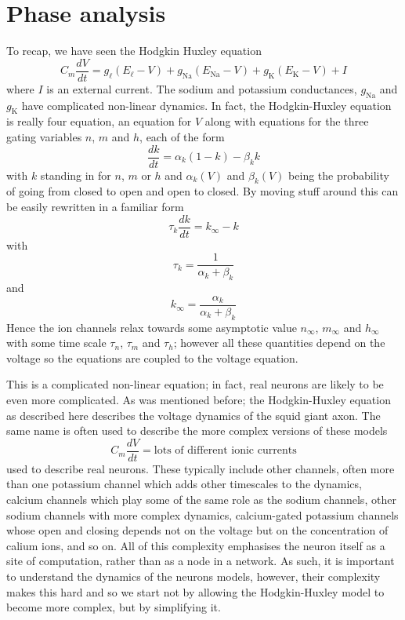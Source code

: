\documentclass[12pt]{article}
\begin{document}
\section*{Phase analysis}
To recap, we have seen the Hodgkin Huxley equation
\begin{equation}
C_m\frac{dV}{dt}=g_\ell(E_{\ell}-V)+g_{\text{Na}}(E_{\text{Na}}-V)+g_{\text{K}}(E_{\text{K}}-V)+I
\end{equation}
where $I$ is an external current. The sodium and potassium conductances, $g_{\text{Na}}$ and
$g_{\text{K}}$ have complicated non-linear dynamics. In fact, the
Hodgkin-Huxley equation is really four equation, an equation for $V$
along with equations for the three gating variables $n$, $m$ and $h$, each of the form
\begin{equation}
\frac{dk}{dt}=\alpha_k(1-k)-\beta_k k
\end{equation}
with $k$ standing in for $n$, $m$ or $h$ and $\alpha_k(V)$ and $\beta_k(V)$
being the probability of going from closed to open and open to
closed. By moving stuff around this can be easily rewritten in a familiar form
\begin{equation}
\tau_k\frac{dk}{dt}=k_\infty - k
\end{equation}
with 
\begin{equation}
\tau_k=\frac{1}{\alpha_k+\beta_k}
\end{equation}
and
\begin{equation}
k_\infty=\frac{\alpha_k}{\alpha_k+\beta_k}
\end{equation}
Hence the ion channels relax towards some asymptotic value $n_\infty$,
$m_\infty$ and $h_\infty$ with some time scale $\tau_n$, $\tau_m$ and
$\tau_h$; however all these quantities depend on the voltage so the
equations are coupled to the voltage equation.

This is a complicated non-linear equation; in fact, real neurons are
likely to be even more complicated. As was mentioned before; the
Hodgkin-Huxley equation as described here describes the voltage
dynamics of the squid giant axon. The same name is often used to
describe the more complex versions of these models
\begin{equation}
C_m\frac{dV}{dt}=\mbox{lots of different ionic currents}
\end{equation}
used to describe real neurons. These typically include other channels,
often more than one potassium channel which adds other timescales to
the dynamics, calcium channels which play some of the same role as the
sodium channels, other sodium channels with more complex dynamics,
calcium-gated potassium channels whose open and closing depends not on
the voltage but on the concentration of calium ions, and so on. All of
this complexity emphasises the neuron itself as a site of computation,
rather than as a node in a network. As such, it is important to
understand the dynamics of the neurons models, however, their
complexity makes this hard and so we start not by allowing the
Hodgkin-Huxley model to become more complex, but by simplifying it.
\end{document}
